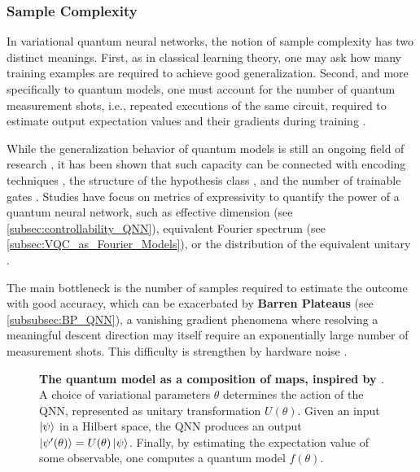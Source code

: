 \documentclass[aps,10pt,groupedaddress,prx,superscriptaddress,twocolumn,balancelastpage, tightenlines]{revtex4-2}
\theoremstyle{plain}  %
\begin{document}
            \subsubsection{Sample Complexity}


In variational quantum neural networks, the notion of sample complexity has two distinct meanings. First, as in classical learning theory, one may ask how many training examples are required to achieve good generalization. Second, and more specifically to quantum models, one must account for the number of quantum measurement shots, i.e., repeated executions of the same circuit, required to estimate output expectation values and their gradients during training \cite{Benedetti_2019_Parameterized, cerezo_variational_2021}.


While the generalization behavior of quantum models is still an ongoing field of research \cite{gil-fuster_understanding_2024}, it has been shown that such capacity can be connected with encoding techniques \cite{caro_pseudo-dimension_2020, Caro_2021_encoding_genaralisation}, the structure of the hypothesis class \cite{banchi_generalization_2021}, and the number of trainable gates \cite{Caro_2022_Generalization}. Studies have focus on metrics of expressivity to quantify the power of a quantum neural network, such as effective dimension \cite{abbas2021power} (see \autoref{subsec:controllability_QNN}), equivalent Fourier spectrum \cite{xiong_fundamental_2025, schuld2019quantum} (see \autoref{subsec:VQC_as_Fourier_Models}), or the distribution of the equivalent unitary \cite{holmes_connecting_2022}.

The main bottleneck is the number of samples required to estimate the outcome with good accuracy, which can be exacerbated by \textbf{Barren Plateaus} \cite{McClean_2018, larocca_barren_2025} (see \autoref{subsubsec:BP_QNN}), a vanishing gradient phenomena where resolving a meaningful descent direction may itself require an exponentially large number of measurement shots. This difficulty is strengthen by hardware noise \cite{wang_noise-induced_2021, kubler_adaptive_2020}.

\begin{figure}[t!]
    \centering
    
    \caption{\textbf{The quantum model as a composition of maps, inspired by \cite{Larocca_2023}}. A choice of variational parameters $\theta$ determines the action of the QNN, represented as unitary transformation $U(\theta)$. Given an input $\ket{\psi}$ in a Hilbert space, the QNN produces an output $\ket{\psi'(\theta)}=U(\theta) \ket{\psi}$. Finally, by estimating the expectation value of some observable, one computes a quantum model $f(\theta)$.}
    \label{fig:Control_Spaces}
\end{figure}
\end{document}
